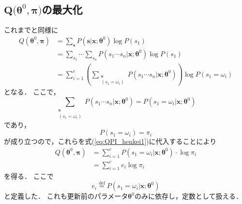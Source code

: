 \documentclass[a4j]{jarticle}
\begin{document}
\subsection*{$\bm{Q(\theta}^{0}, \bm{\pi)}$の最大化}
これまでと同様に
\begin{align}
Q(\bm{\theta}^{0}, \bm{\pi}) & = \sum_{\mathbf{s}} P(\mathbf{s} | \mathbf{x}; \bm{\theta}^{0}) \log P(s_{1}) \\
& = \sum_{s_{1}} \cdots \sum_{s_{n}} P(s_{1} \cdots s_{n} | \mathbf{x}; \bm{\theta}^{0})  \log P(s_{1})  \\
& =  \sum_{i=1}^{c} \left( \sum_{\substack{\mathbf{s} \\ (s_{1} = \omega_{i})}} P(s_{1} \cdots s_{n} | \mathbf{x}; \bm{\theta}^{0}) \right) \log P(s_{1} = \omega_{i}) \label{eq:QPI_henkei1}
\end{align}
となる．
ここで，
\begin{equation}
\sum_{\substack{\mathbf{s} \\ (s_{1} = \omega_{i})}} P(s_{1} \cdots s_{n} | \mathbf{x}; \bm{\theta}^{0}) = P(s_{1} = \omega_{i} | \mathbf{x};  \bm{\theta}^{0})
\end{equation}
であり，
\begin{equation}
P(s_{1} = \omega_{i}) = \pi_{i}
\end{equation}
が成り立つので，これらを式(\ref{eq:QPI_henkei1})に代入することにより
\begin{align}
Q(\bm{\theta}^{0}, \bm{\pi}) & = \sum_{i=1}^{c} P(s_{1} = \omega_{i} | \mathbf{x}; \bm{\theta}^{0}) \cdot \log \pi_{i} \\
& = \sum_{i=1}^{c} e_{i} \log \pi_{i} \label{eq:Q_PI_last}
\end{align}
を得る．
ここで
\begin{equation}
e_{i} \overset{\mathrm{def}}{=} P(s_{1} = \omega_{i} | \mathbf{x}; \bm{\theta}^{0}) \label{eq:def_ei}
\end{equation}
と定義した．
これも更新前のパラメータ$\bm{\theta}^{0}$のみに依存し，定数として扱える．
\end{document}
